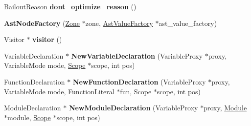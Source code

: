 \begin{DoxyCompactItemize}
\item 
\hypertarget{classv8_1_1internal_1_1_b_a_s_e___e_m_b_e_d_d_e_d_a058573490f3700a7aab7f398d0f55f27}{}Bailout\+Reason {\bfseries dont\+\_\+optimize\+\_\+reason} ()\label{classv8_1_1internal_1_1_b_a_s_e___e_m_b_e_d_d_e_d_a058573490f3700a7aab7f398d0f55f27}

\item 
\hypertarget{classv8_1_1internal_1_1_b_a_s_e___e_m_b_e_d_d_e_d_a682c091836b5b50ce6357a6b355c0a75}{}{\bfseries Ast\+Node\+Factory} (\hyperlink{classv8_1_1internal_1_1_zone}{Zone} $\ast$zone, \hyperlink{classv8_1_1internal_1_1_ast_value_factory}{Ast\+Value\+Factory} $\ast$ast\+\_\+value\+\_\+factory)\label{classv8_1_1internal_1_1_b_a_s_e___e_m_b_e_d_d_e_d_a682c091836b5b50ce6357a6b355c0a75}

\item 
\hypertarget{classv8_1_1internal_1_1_b_a_s_e___e_m_b_e_d_d_e_d_a4f3606c906ffb933c8c202e2565dea9d}{}Visitor $\ast$ {\bfseries visitor} ()\label{classv8_1_1internal_1_1_b_a_s_e___e_m_b_e_d_d_e_d_a4f3606c906ffb933c8c202e2565dea9d}

\item 
\hypertarget{classv8_1_1internal_1_1_b_a_s_e___e_m_b_e_d_d_e_d_a51d6f4d74c9323b232d6ec5fdc914657}{}Variable\+Declaration $\ast$ {\bfseries New\+Variable\+Declaration} (Variable\+Proxy $\ast$proxy, Variable\+Mode mode, \hyperlink{classv8_1_1internal_1_1_scope}{Scope} $\ast$scope, int pos)\label{classv8_1_1internal_1_1_b_a_s_e___e_m_b_e_d_d_e_d_a51d6f4d74c9323b232d6ec5fdc914657}

\item 
\hypertarget{classv8_1_1internal_1_1_b_a_s_e___e_m_b_e_d_d_e_d_aeb454801e908e2aa7333a76c6922cf18}{}Function\+Declaration $\ast$ {\bfseries New\+Function\+Declaration} (Variable\+Proxy $\ast$proxy, Variable\+Mode mode, Function\+Literal $\ast$fun, \hyperlink{classv8_1_1internal_1_1_scope}{Scope} $\ast$scope, int pos)\label{classv8_1_1internal_1_1_b_a_s_e___e_m_b_e_d_d_e_d_aeb454801e908e2aa7333a76c6922cf18}

\item 
\hypertarget{classv8_1_1internal_1_1_b_a_s_e___e_m_b_e_d_d_e_d_a22806cf6290956ced9962a9514b3acf8}{}Module\+Declaration $\ast$ {\bfseries New\+Module\+Declaration} (Variable\+Proxy $\ast$proxy, \hyperlink{classv8_1_1internal_1_1_module}{Module} $\ast$module, \hyperlink{classv8_1_1internal_1_1_scope}{Scope} $\ast$scope, int pos)\label{classv8_1_1internal_1_1_b_a_s_e___e_m_b_e_d_d_e_d_a22806cf6290956ced9962a9514b3acf8}


\end{DoxyCompactItemize}

